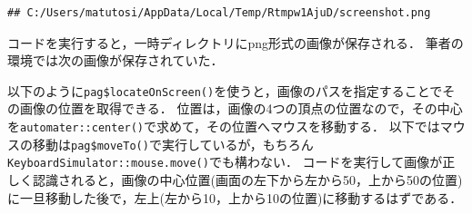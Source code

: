 \documentclass[
]{article}
\newenvironment{Shaded}{\begin{snugshade}}{\end{snugshade}}
\newcommand{\AttributeTok}[1]{\textcolor[rgb]{0.13,0.29,0.53}{#1}}
\newcommand{\CommentTok}[1]{\textcolor[rgb]{0.56,0.35,0.01}{\textit{#1}}}
\newcommand{\DecValTok}[1]{\textcolor[rgb]{0.00,0.00,0.81}{#1}}
\newcommand{\FunctionTok}[1]{\textcolor[rgb]{0.13,0.29,0.53}{\textbf{#1}}}
\newcommand{\NormalTok}[1]{#1}
\newcommand{\OtherTok}[1]{\textcolor[rgb]{0.56,0.35,0.01}{#1}}
\newcommand{\SpecialCharTok}[1]{\textcolor[rgb]{0.81,0.36,0.00}{\textbf{#1}}}
\newcommand{\StringTok}[1]{\textcolor[rgb]{0.31,0.60,0.02}{#1}}
\begin{document}
\begin{Shaded}
\end{Shaded}

\begin{verbatim}
## C:/Users/matutosi/AppData/Local/Temp/Rtmpw1AjuD/screenshot.png
\end{verbatim}

コードを実行すると，一時ディレクトリにpng形式の画像が保存される．
筆者の環境では次の画像が保存されていた．

以下のように\texttt{pag\$locateOnScreen()}を使うと，画像のパスを指定することでその画像の位置を取得できる．
位置は，画像の4つの頂点の位置なので，その中心を\texttt{automater::center()}で求めて，その位置へマウスを移動する．
以下ではマウスの移動は\texttt{pag\$moveTo()}で実行しているが，もちろん\texttt{KeyboardSimulator::mouse.move()}でも構わない．
コードを実行して画像が正しく認識されると，画像の中心位置(画面の左下から左から50，上から50の位置)に一旦移動した後で，左上(左から10，上から10の位置)に移動するはずである．

\begin{Shaded}
\end{Shaded}
\end{document}
